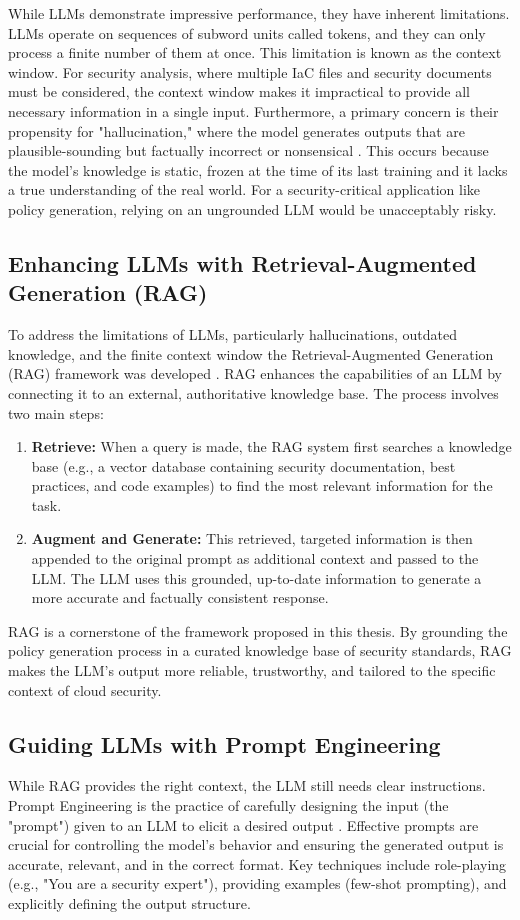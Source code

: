 While LLMs demonstrate impressive performance, they have inherent limitations. LLMs operate on sequences of subword units called tokens, and they can only process a finite number of them at once. This limitation is known as the context window. For security analysis, where multiple IaC files and security documents must be considered, the context window makes it impractical to provide all necessary information in a single input. Furthermore, a primary concern is their propensity for "hallucination," where the model generates outputs that are plausible-sounding but factually incorrect or nonsensical \cite{haque_sok_2025-1}. This occurs because the model's knowledge is static, frozen at the time of its last training and it lacks a true understanding of the real world. For a security-critical application like policy generation, relying on an ungrounded LLM would be unacceptably risky.

\subsection{Enhancing LLMs with Retrieval-Augmented Generation (RAG)}
To address the limitations of LLMs, particularly hallucinations, outdated knowledge, and the finite context window the Retrieval-Augmented Generation (RAG) framework was developed \cite{lewis_retrieval-augmented_2020}. RAG enhances the capabilities of an LLM by connecting it to an external, authoritative knowledge base. The process involves two main steps:
\begin{enumerate}
    \item \textbf{Retrieve:} When a query is made, the RAG system first searches a knowledge base (e.g., a vector database containing security documentation, best practices, and code examples) to find the most relevant information for the task.
    \item \textbf{Augment and Generate:} This retrieved, targeted information is then appended to the original prompt as additional context and passed to the LLM. The LLM uses this grounded, up-to-date information to generate a more accurate and factually consistent response.
\end{enumerate}
RAG is a cornerstone of the framework proposed in this thesis. By grounding the policy generation process in a curated knowledge base of security standards, RAG makes the LLM's output more reliable, trustworthy, and tailored to the specific context of cloud security.

\subsection{Guiding LLMs with Prompt Engineering}
While RAG provides the right context, the LLM still needs clear instructions. Prompt Engineering is the practice of carefully designing the input (the "prompt") given to an LLM to elicit a desired output \cite{sahoo_systematic_2024}. Effective prompts are crucial for controlling the model's behavior and ensuring the generated output is accurate, relevant, and in the correct format. Key techniques include role-playing (e.g., "You are a security expert"), providing examples (few-shot prompting), and explicitly defining the output structure.

